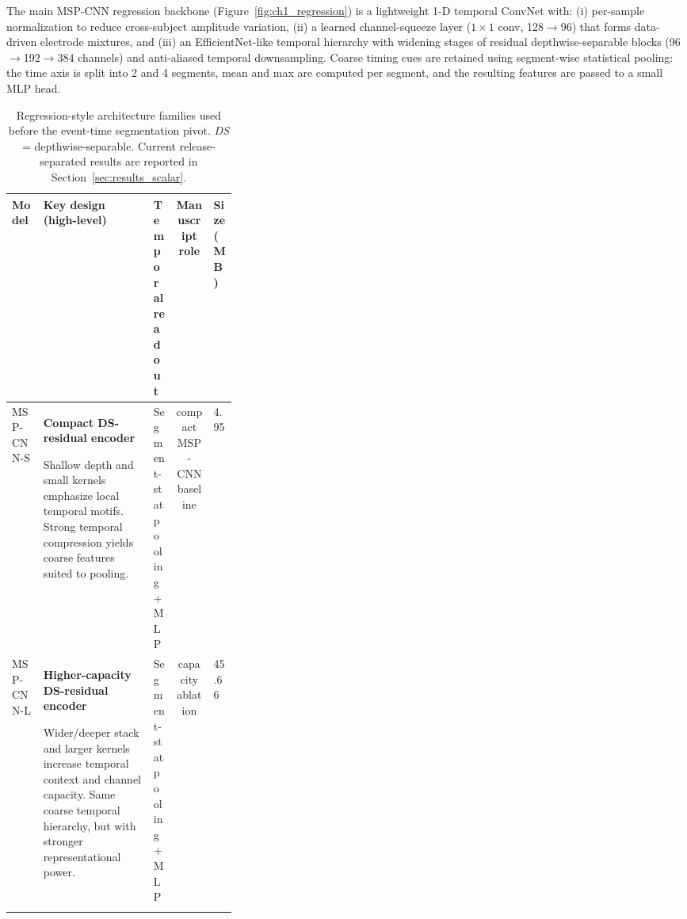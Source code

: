 \documentclass[12pt]{article}
\renewcommand{\baselinestretch}{1.05}
\begin{document}
The main MSP-CNN regression backbone (Figure~\ref{fig:ch1_regression}) is a lightweight 1-D temporal ConvNet with:
(i) per-sample normalization to reduce cross-subject amplitude variation,
(ii) a learned channel-squeeze layer ($1\times1$ conv, 128$\rightarrow$96) that forms data-driven electrode mixtures,
and (iii) an EfficientNet-like temporal hierarchy with widening stages of residual depthwise-separable blocks
(96$\rightarrow$192$\rightarrow$384 channels) and anti-aliased temporal downsampling.
Coarse timing cues are retained using segment-wise statistical pooling: the time axis is split into 2 and 4 segments,
mean and max are computed per segment, and the resulting features are passed to a small MLP head.

\begin{table}[!t]
\centering
\caption{Regression-style architecture families used before the event-time segmentation pivot. \emph{DS} = depthwise-separable. Current release-separated results are reported in Section~\ref{sec:results_scalar}.}
\label{tab:rt_regression_models}

\begingroup
\renewcommand{\baselinestretch}{1}\selectfont
\footnotesize
\setlength{\tabcolsep}{3pt}
\renewcommand{\arraystretch}{0.95}

\begin{tabularx}{\linewidth}{@{} 
p{0.14\linewidth} 
Y 
p{0.10\linewidth} 
c 
p{0.09\linewidth} 
@{}}

\toprule
\textbf{Model} & \textbf{Key design (high-level)} & \textbf{Temporal readout} & \textbf{Manuscript role} & \textbf{Size (MB)} \\

\midrule
MSP-CNN-S &
\textbf{Compact DS-residual encoder}\par
Shallow depth and small kernels emphasize local temporal motifs.
Strong temporal compression yields coarse features suited to pooling. &
Segment-stat pooling + MLP & compact MSP-CNN baseline & 4.95 \\

\addlinespace[0.3em]

MSP-CNN-L &
\textbf{Higher-capacity DS-residual encoder}\par
Wider/deeper stack and larger kernels increase temporal context and channel capacity.
Same coarse temporal hierarchy, but with stronger representational power. &
Segment-stat pooling + MLP & capacity ablation & 45.66 \\

\addlinespace[0.3em]


\end{tabularx}
\end{table}
\end{document}
